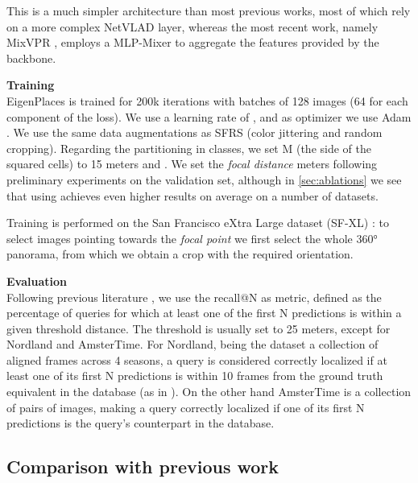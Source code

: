 \documentclass[10pt,twocolumn,letterpaper]{article}
\newcommand{\myparagraph}[1]{\vspace{4pt}\noindent\textbf{#1}}
\begin{document}
This is a much simpler architecture than most previous works, most of which \cite{Arandjelovic_2018_netvlad,Liu_2019_sare,Kim_2017_crn,Ge_2020_sfrs, Peng_2021_appsvr} rely on a more complex NetVLAD layer,
whereas the most recent work, namely MixVPR \cite{Alibey_2023_mixvpr}, employs a MLP-Mixer to aggregate the features provided by the backbone.

\myparagraph{Training} \\
EigenPlaces is trained for 200k iterations with batches of 128 images (64 for each component of the loss).
We use a learning rate of , and as optimizer we use Adam \cite{Kingma_2014_adam}.
We use the same data augmentations as SFRS \cite{Ge_2020_sfrs} (color jittering and random cropping).
Regarding the partitioning in classes, we set M (the side of the squared cells) to 15 meters and .
We set the \textit{focal distance}  meters following preliminary experiments on the validation set, although in \cref{sec:ablations} we see that using  achieves even higher results on average on a number of datasets.

Training is performed on the San Francisco eXtra Large dataset (SF-XL) \cite{Berton_2022_cosPlace}:
to select images pointing towards the \emph{focal point} we first select the whole 360° panorama, from which we obtain a crop with the required orientation.


\myparagraph{Evaluation} \\
Following previous literature \cite{Arandjelovic_2018_netvlad, Kim_2017_crn, Alibey_2022_gsvcities, Alibey_2023_mixvpr, Berton_2022_cosPlace, Masone_2021_survey, Ibrahimi_2021_insideout_vpr, Zaffar_2021_vprbench, Wang_2022_TransVPR,Zhang_2021_gated_netvlad}, we use the recall@N as metric, defined as the percentage of queries for which at least one of the first N predictions is within a given threshold distance.
The threshold is usually set to 25 meters, except for Nordland and AmsterTime.
For Nordland, being the dataset a collection of aligned frames across 4 seasons, a query is considered correctly localized if at least one of its first N predictions is within 10 frames from the ground truth equivalent in the database (as in \cite{Hausler_2019, Hausler_2021_patch_netvlad}).
On the other hand AmsterTime \cite{Yildiz_2022_AmsterTime} is a collection of pairs of images, making a query correctly localized if one of its first N predictions is the query's counterpart in the database.



\subsection{Comparison with previous work}
\end{document}
